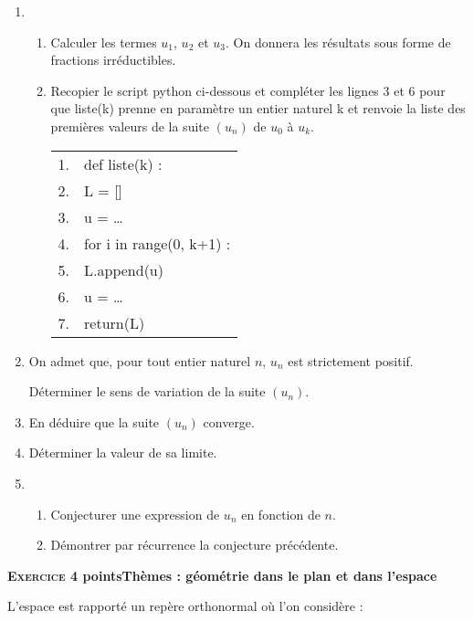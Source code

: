 \documentclass[11pt]{article}
\begin{document}
\begin{enumerate}
\item 
	\begin{enumerate}
		\item Calculer les termes $u_1$, $u_2$  et $u_3$. On  donnera les résultats sous forme de fractions irréductibles.
		\item Recopier le script python ci-dessous et compléter les lignes 3 et 6 pour que liste(k) prenne en paramètre un entier naturel k et renvoie la liste des premières valeurs de la suite $\left(u_n\right)$ de $u_0$ à $u_k$.

\begin{center}
\begin{tabularx}{0.5\linewidth}{|l|X|}\hline
1.&def liste(k) :\\
2.&\qquad L = []\\
3.&\qquad u = \ldots\\
4.&\qquad for i in range(0, k+1) :\\
5.&\quad \qquad L.append(u)\\
6.&\quad \qquad u = \ldots\\
7.&\qquad return(L)\\ \hline
\end{tabularx}
\end{center}
	\end{enumerate}
\item On admet que, pour tout entier naturel $n$, $u_n$ est strictement positif.

Déterminer le sens de variation de la suite $\left(u_n\right)$.
\item En déduire que la suite $\left(u_n\right)$ converge.
\item Déterminer la valeur de sa limite.
\item 
	\begin{enumerate}
		\item Conjecturer une expression de $u_n$ en fonction de $n$.
		\item Démontrer par récurrence la conjecture précédente.
	\end{enumerate}
\end{enumerate}

\bigskip

\textbf{\textsc{Exercice 4}   points\hfill Thèmes : géométrie dans le plan et dans l'espace}

\medskip

L'espace est rapporté un repère orthonormal où l'on considère :
\end{document}
